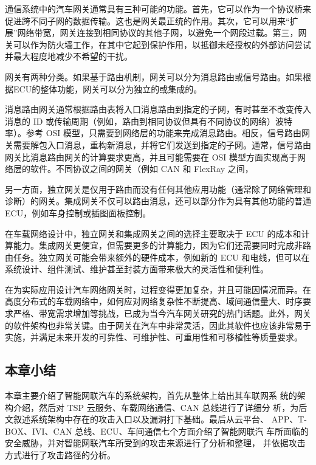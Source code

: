通信系统中的汽车网关通常具有三种可能的功能。首先，它可以作为一个协议桥来促进跨不同子网的数据传输。这也是网关最正统的作用。其次，它可以用来“扩展”网络带宽，网关连接到相同协议的其他子网，以避免一个网段过载。第三，网关可以作为防火墙工作，在其中它起到保护作用，以抵御未经授权的外部访问尝试并最大程度地减少不希望的干扰。

网关有两种分类。如果基于路由机制，网关可以分为消息路由或信号路由。如果根据ECU的整体功能，网关可以分为独立的或集成的。

消息路由网关通常根据路由表将入口消息路由到指定的子网，有时甚至不改变传入消息的 ID 或传输周期（例如，路由到相同协议但具有不同协议的网络）波特率）。参考 OSI 模型，只需要到网络层的功能来完成消息路由。相反，信号路由网关需要解包入口消息，重构新消息，并将它们发送到指定的子网。通常，信号路由网关比消息路由网关的计算要求更高，并且可能需要在 OSI 模型方面实现高于网络层的软件。不同协议之间的网关（例如 CAN 和 FlexRay 之间，

另一方面，独立网关是仅用于路由而没有任何其他应用功能（通常除了网络管理和诊断）的网关。集成网关不仅可以路由消息，还可以部分作为具有其他功能的普通 ECU，例如车身控制或插图面板控制。

在车载网络设计中，独立网关和集成网关之间的选择主要取决于 ECU 的成本和计算能力。集成网关更便宜，但需要更多的计算能力，因为它们还需要同时完成非路由任务。独立网关可能会带来额外的硬件成本，例如新的 ECU 和电线，但可以在系统设计、组件测试、维护甚至封装方面带来极大的灵活性和便利性。

在为实际应用设计汽车网络网关时，过程变得更加复杂，并且可能因情况而异。在高度分布式的车载网络中，如何应对网络复杂性不断提高、域间通信量大、时序要求严格、带宽需求增加等挑战，已成为当今汽车网关研究的热门话题。此外，网关的软件架构也非常关键。由于网关在汽车中非常灵活，因此其软件也应该非常易于实施，并满足未来开发的可靠性、可维护性、可重用性和可移植性等质量要求。

\subsection[]{本章小结}

本章主要介绍了智能网联汽车的系统架构，首先从整体上给出其车联网系
统的架构介绍，然后对 TSP 云服务、车载网络通信、CAN 总线进行了详细分
析，为后文叙述系统架构中存在的攻击入口以及漏洞打下基础。最后从云平台、
APP、T-BOX、IVI、CAN 总线、ECU、车间通信七个方面介绍了智能网联汽
车所面临的安全威胁，并对智能网联汽车所受到的攻击来源进行了分析和整理，
并依据攻击方式进行了攻击路径的分析。